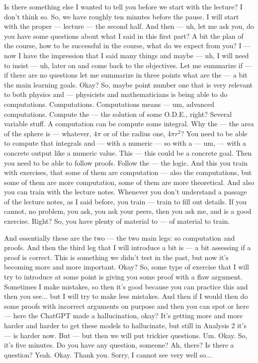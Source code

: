 \begin{spoken-clean}[00:08:20 - 00:10:30]
Is there something else I wanted to tell you before we start with the lecture? I don't think so. So, we have roughly ten minutes before the pause. I will start with the proper --- lecture --- the second half. And then --- uh, let me ask you, do you have some questions about what I said in this first part? A bit the plan of the course, how to be successful in the course, what do we expect from you? I --- now I have the impression that I said many things and maybe --- uh, I will need to insist --- uh, later on and come back to the objectives. Let me summarize if --- if there are no questions let me summarize in three points what are the --- a bit the main learning goals. Okay? So, maybe point number one that is very relevant to both physics and --- physicists and mathematicians is being able to do computations. Computations. Computations means --- um, advanced computations. Compute the --- the solution of some O.D.E., right? Several variable stuff. A computation can be compute some integral. Why the --- the area of the sphere is --- whatever, $4\pi$ or of the radius one, $4\pi r^2$? You need to be able to compute that integrals and --- with a numeric --- so with a --- um, --- with a concrete output like a numeric value. This --- this could be a concrete goal. Then you need to be able to follow proofs. Follow the --- the logic. And this you train with exercises, that some of them are computation --- also the computations, but some of them are more computation, some of them are more theoretical. And also you can train with the lecture notes. Whenever you don't understand a passage of the lecture notes, as I said before, you train --- train to fill out details. If you cannot, no problem, you ask, you ask your peers, then you ask me, and is a good exercise. Right? So, you have plenty of material to --- of material to train.
\end{spoken-clean}

\begin{spoken-clean}[00:10:30 - 00:11:36]
And essentially these are the two --- the two main legs: so computation and proofs. And then the third leg that I will introduce a bit is --- a bit assessing if a proof is correct. This is something we didn't test in the past, but now it's becoming more and more important. Okay? So, some type of exercise that I will try to introduce at some point is giving you some proof with a flaw argument. Sometimes I make mistakes, so then it's good because you can practice this and then you see... but I will try to make less mistakes. And then if I would then do some proofs with incorrect arguments on purpose and then you can spot  or here --- here the ChatGPT made a hallucination, okay? It's getting more and more harder and harder to get these models to hallucinate, but still in Analysis 2 it's --- is harder now. But --- but then we will put trickier questions. Um. Okay. So, it's five minutes. Do you have any question, someone? Ah, there? Is there a question? Yeah. Okay. Thank you. Sorry, I cannot see very well so...
\end{spoken-clean}

